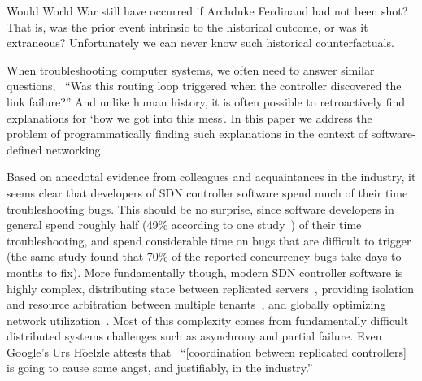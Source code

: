 
Would World War  still have occurred if Archduke Ferdinand had not been
shot? %
That is, was the prior event intrinsic to the
historical outcome, or
was it extraneous? Unfortunately we can never know such
historical counterfactuals.

When troubleshooting computer systems, we often need to answer similar questions,
\eg~``Was this routing loop triggered when the controller discovered the link failure?''
And unlike human history, it is often possible to retroactively find explanations for
`how we got into this mess'. In this paper we address the problem of programmatically
finding such explanations in the context of software-defined networking.


Based on anecdotal evidence from colleagues and acquaintances in the industry, it seems clear that
developers of SDN controller software spend much of their time
troubleshooting bugs. This should be no surprise, since software developers in
general spend roughly half (49\% according to one
study~\cite{msoft_concurrency}) of their time troubleshooting, and spend
considerable time on bugs that are difficult to trigger
(the same study found that 70\% of the reported concurrency bugs
take days to months to fix).
More fundamentally though, modern SDN controller software is highly complex,
distributing state between replicated
servers~\cite{floodlight},
providing isolation and resource arbitration between multiple
tenants~\cite{Casado:2010:VNF:1921151.1921162}, and
globally optimizing network utilization~\cite{urs}.
Most of this complexity comes from
fundamentally difficult distributed systems challenges such as asynchrony and
partial failure. Even Google's Urs H$\ddot{\mathrm{o}}$elzle
attests that~\cite{urs} ``[coordination between replicated controllers] is going to
cause some angst, and justifiably, in the industry.''

